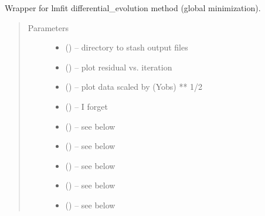 \documentclass[letterpaper,10pt,english]{sphinxmanual}
\begin{document}
\begin{fulllineitems}
\begin{fulllineitems}
\end{fulllineitems}


\begin{fulllineitems}
\label{\detokenize{rst/refinement:mstack.refinement.Refinement.diffev_minimize}}
Wrapper for lmfit differential\_evolution method (global minimization).
\begin{quote}\begin{description}
\item[{Parameters}] \leavevmode\begin{itemize}
\item {} 
 () -- directory to stash output files

\item {} 
 () -- plot residual vs. iteration

\item {} 
 () -- plot data scaled by (Yobs) ** 1/2

\item {} 
 () -- I forget

\item {} 
 () -- see below

\item {} 
 () -- see below

\item {} 
 () -- see below

\item {} 
 () -- see below

\item {} 
 () -- see below


\end{itemize}
\end{description}
\end{quote}
\end{fulllineitems}
\end{fulllineitems}
\end{document}
